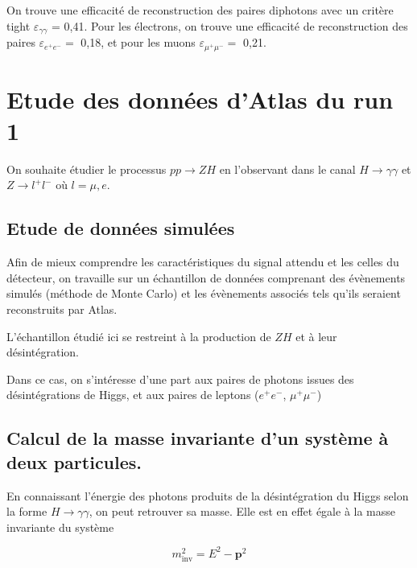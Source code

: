\documentclass[11pt]{article} %
\begin{document}
On trouve une efficacité de reconstruction des paires diphotons avec un critère tight $\varepsilon_{\gamma\gamma}$ = 0,41.
Pour les électrons, on trouve une efficacité de reconstruction des paires $\varepsilon_{e^+e^-} =$ 0,18, et pour les muons $\varepsilon_{\mu^+\mu^-} =$ 0,21.


\section{Etude des données d'Atlas du run 1}

On souhaite étudier le processus $pp\to ZH$ en l'observant dans le canal $H\to\gamma\gamma$ et $Z\to l^+l^-$ où $l=\mu,e$.

\subsection{Etude de données simulées}

Afin de mieux comprendre les caractéristiques du signal attendu et les celles du détecteur, on travaille sur un échantillon de données comprenant des évènements simulés (méthode de Monte Carlo) et les évènements associés tels qu'ils seraient reconstruits par Atlas.

L'échantillon étudié ici se restreint à la production de $ZH$ et à leur désintégration.

Dans ce cas, on s'intéresse d'une part aux paires de photons issues des désintégrations de Higgs, et aux paires de leptons ($e^+e^-$, $\mu^+\mu^-$)


\subsection{Calcul de la masse invariante d'un système à deux particules.}

En connaissant l'énergie des photons produits de la désintégration du Higgs selon la forme $H\to \gamma \gamma$, on peut retrouver sa masse. Elle est en effet égale à la masse invariante du système 

\begin{equation}
m_{\textrm{inv}}^2 = E^2 - \textbf{p}^2
\end{equation}
\end{document}
